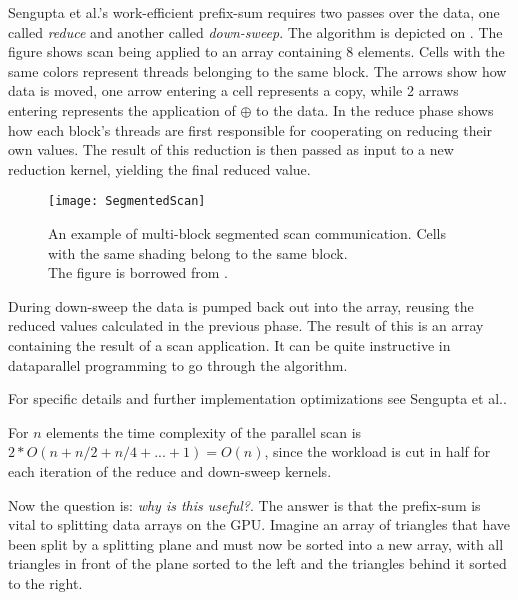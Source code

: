 
Sengupta et al.'s work-efficient prefix-sum
requires two passes over the data, one called \textit{reduce} and
another called \textit{down-sweep}. The algorithm is depicted on
. The figure shows scan being applied to an array
containing 8 elements. Cells with the same colors represent threads
belonging to the same block. The arrows show how data is moved, one
arrow entering a cell represents a copy, while 2 arraws entering
represents the application of $\oplus$ to the data. In the reduce
phase  shows how each block's threads are first
responsible for cooperating on reducing their own values. The result
of this reduction is then passed as input to a new reduction kernel,
yielding the final reduced value.

\begin{figure}
  \centering
  \texttt{[image: SegmentedScan]}

  \parbox{5cm}{\caption[Multi-block segmented scan communication.]{An
      example of multi-block segmented scan communication. Cells with
      the same shading belong to the same block. \\The figure is
      borrowed from .}\label{fig:segScan}}
\end{figure}

During down-sweep the data is pumped back out into the array, reusing
the reduced values calculated in the previous phase. The result of
this is an array containing the result of a scan application. It can
be quite instructive in dataparallel programming to go through the
algorithm.

For specific details and further implementation optimizations see
Sengupta et al..



For $n$ elements the time complexity of the parallel scan is $2 * O(n
+ n/2 + n/4 + ... + 1) = O(n)$, since the workload is cut in half for
each iteration of the reduce and down-sweep kernels.



Now the question is: \textit{why is this useful?}. The answer is that
the prefix-sum is vital to splitting data arrays on the GPU. Imagine
an array of triangles that have been split by a splitting plane and
must now be sorted into a new array, with all triangles in front of
the plane sorted to the left and the triangles behind it sorted to the
right. 

